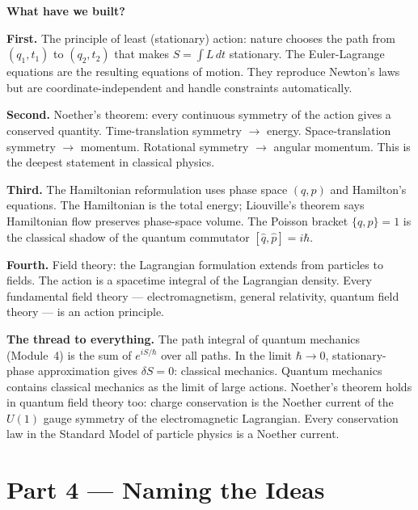\documentclass[12pt,a4paper]{article}
\begin{document}
\begin{discoverybox}
\textbf{What have we built?}

\textbf{First.} The principle of least (stationary) action: nature chooses the path from $(q_1,t_1)$ to $(q_2,t_2)$ that makes $S=\int L\,dt$ stationary. The Euler-Lagrange equations are the resulting equations of motion. They reproduce Newton's laws but are coordinate-independent and handle constraints automatically.

\textbf{Second.} Noether's theorem: every continuous symmetry of the action gives a conserved quantity. Time-translation symmetry $\to$ energy. Space-translation symmetry $\to$ momentum. Rotational symmetry $\to$ angular momentum. This is the deepest statement in classical physics.

\textbf{Third.} The Hamiltonian reformulation uses phase space $(q,p)$ and Hamilton's equations. The Hamiltonian is the total energy; Liouville's theorem says Hamiltonian flow preserves phase-space volume. The Poisson bracket $\{q,p\}=1$ is the classical shadow of the quantum commutator $[\hat q,\hat p]=i\hbar$.

\textbf{Fourth.} Field theory: the Lagrangian formulation extends from particles to fields. The action is a spacetime integral of the Lagrangian density. Every fundamental field theory --- electromagnetism, general relativity, quantum field theory --- is an action principle.

\medskip
\textbf{The thread to everything.} The path integral of quantum mechanics (Module~4) is the sum of $e^{iS/\hbar}$ over all paths. In the limit $\hbar\to 0$, stationary-phase approximation gives $\delta S=0$: classical mechanics. Quantum mechanics contains classical mechanics as the limit of large actions. Noether's theorem holds in quantum field theory too: charge conservation is the Noether current of the $U(1)$ gauge symmetry of the electromagnetic Lagrangian. Every conservation law in the Standard Model of particle physics is a Noether current.
\end{discoverybox}

\section{Part 4 \texorpdfstring{---}{--} Naming the Ideas}
\end{document}
